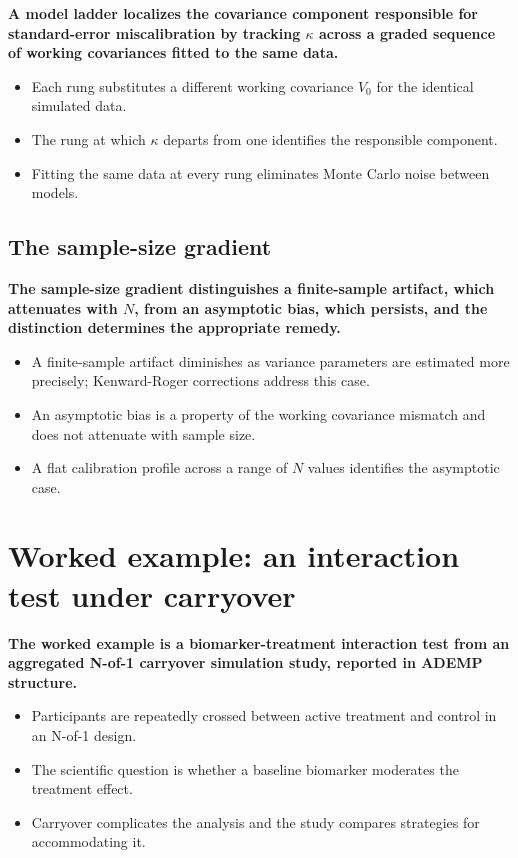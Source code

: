 \documentclass[
  11pt,
]{article}
\begin{document}
\textbf{A model ladder localizes the covariance component responsible for standard-error miscalibration by tracking $\kappa$ across a graded sequence of working covariances fitted to the same data.}

\begin{itemize}\setlength{\itemsep}{2pt}\setlength{\parskip}{0pt}
\item Each rung substitutes a different working covariance $V_0$ for the identical simulated data.
\item The rung at which $\kappa$ departs from one identifies the responsible component.
\item Fitting the same data at every rung eliminates Monte Carlo noise between models.
\end{itemize}

\subsection{The sample-size gradient}\label{the-sample-size-gradient}

\textbf{The sample-size gradient distinguishes a finite-sample artifact, which attenuates with $N$, from an asymptotic bias, which persists, and the distinction determines the appropriate remedy.}

\begin{itemize}\setlength{\itemsep}{2pt}\setlength{\parskip}{0pt}
\item A finite-sample artifact diminishes as variance parameters are estimated more precisely; Kenward-Roger corrections address this case.
\item An asymptotic bias is a property of the working covariance mismatch and does not attenuate with sample size.
\item A flat calibration profile across a range of $N$ values identifies the asymptotic case.
\end{itemize}

\section{Worked example: an interaction test under carryover}\label{worked-example-an-interaction-test-under-carryover}

\textbf{The worked example is a biomarker-treatment interaction test from an aggregated N-of-1 carryover simulation study, reported in ADEMP structure.}

\begin{itemize}\setlength{\itemsep}{2pt}\setlength{\parskip}{0pt}
\item Participants are repeatedly crossed between active treatment and control in an N-of-1 design.
\item The scientific question is whether a baseline biomarker moderates the treatment effect.
\item Carryover complicates the analysis and the study compares strategies for accommodating it.
\end{itemize}
\end{document}
